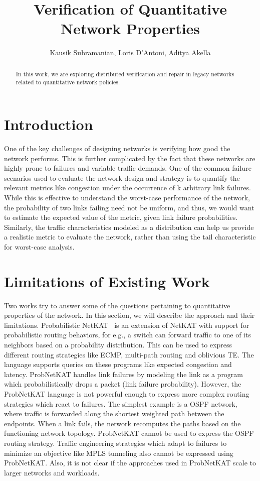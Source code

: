 \documentclass[]{article}
\title{Verification of Quantitative Network Properties}
\author{Kausik Subramanian, Loris D'Antoni, Aditya Akella}
\begin{document}
\maketitle

\begin{abstract}
In this work, we are exploring distributed verification and repair in 
legacy networks related to quantitative network policies.
\end{abstract}

\section{Introduction}
One of the key challenges of designing networks is verifying how good the network performs. This is further complicated by the fact that these networks are highly prone to failures and variable traffic demands. One of the common failure scenarios used to evaluate the network design and strategy is to quantify the relevant metrics like congestion under the occurrence  of k arbitrary link failures. While this is effective to understand the worst-case performance of the network, the probability of two links failing need not be uniform, and thus, we would want to estimate the expected value of the metric, given link failure probabilities. Similarly, the traffic characteristics modeled as a distribution can help us provide a realistic metric to evaluate the network, rather than using the tail characteristic for worst-case analysis. 

\section{Limitations of Existing Work}
Two works try to answer some of the questions pertaining to quantitative properties of the network. In this section, we will describe the approach and their limitations.
Probabilistic NetKAT~\cite{probnetkat} is an extension of NetKAT with support for probabilistic routing behaviors, for e.g., a switch can forward traffic to one of its neighbors based on a probability distribution. This can be used to express different routing strategies like ECMP, multi-path routing and oblivious TE. The language supports queries on these programs like expected congestion and latency. ProbNetKAT handles link failures by modeling the link as a program which probabilistically drops a packet (link failure probability). However, the ProbNetKAT language is not powerful enough to express more complex routing strategies which react to failures. The simplest example is a OSPF network, where traffic is forwarded along the shortest weighted path between the endpoints. When a link fails, the network recomputes the paths based on the functioning network topology. ProbNetKAT cannot be used to express the OSPF routing strategy. Traffic engineering strategies which adapt to failures to minimize an objective like MPLS tunneling also cannot be expressed using ProbNetKAT. Also, it is not clear if the approaches used in ProbNetKAT scale to larger networks and workloads.
\end{document}

